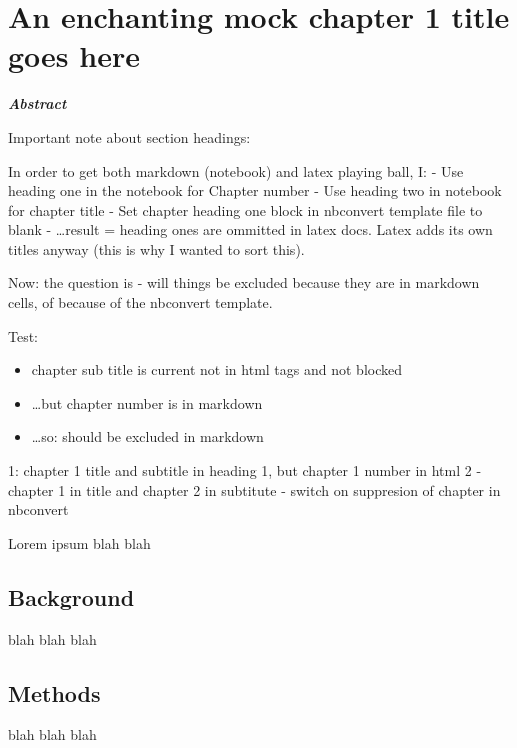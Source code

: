 

 \chapter{An enchanting mock chapter 1 title goes here} 

 \graphicspath{{mock_Chapter1/}} 

 


    \textbf{\emph{Abstract}}

    Important note about section headings:

In order to get both markdown (notebook) and latex playing ball, I: -
Use heading one in the notebook for Chapter number - Use heading two in
notebook for chapter title - Set chapter heading one block in nbconvert
template file to blank - \ldots{}result = heading ones are ommitted in
latex docs. Latex adds its own titles anyway (this is why I wanted to
sort this).

    Now: the question is - will things be excluded because they are in
markdown cells, of because of the nbconvert template.

Test:

\begin{itemize}
\item
  chapter sub title is current not in html tags and not blocked
\item
  \ldots{}but chapter number is in markdown
\item
  \ldots{}so: should be excluded in markdown
\end{itemize}

1: chapter 1 title and subtitle in heading 1, but chapter 1 number in
html 2 - chapter 1 in title and chapter 2 in subtitute - switch on
suppresion of chapter in nbconvert

    Lorem ipsum blah blah


    \section{Background}


    blah blah blah


    \section{Methods}


    blah blah blah

